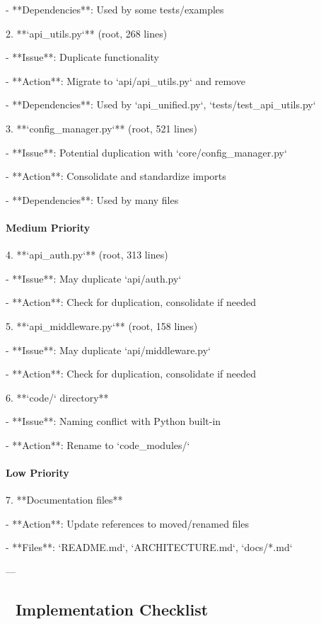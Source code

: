 \documentclass[11pt,a4paper]{article}
\begin{document}
   - **Dependencies**: Used by some tests/examples

2. **`api\_utils.py`** (root, 268 lines)

   - **Issue**: Duplicate functionality

   - **Action**: Migrate to `api/api\_utils.py` and remove

   - **Dependencies**: Used by `api\_unified.py`, `tests/test\_api\_utils.py`

3. **`config\_manager.py`** (root, 521 lines)

   - **Issue**: Potential duplication with `core/config\_manager.py`

   - **Action**: Consolidate and standardize imports

   - **Dependencies**: Used by many files

\paragraph{Medium Priority}

4. **`api\_auth.py`** (root, 313 lines)

   - **Issue**: May duplicate `api/auth.py`

   - **Action**: Check for duplication, consolidate if needed

5. **`api\_middleware.py`** (root, 158 lines)

   - **Issue**: May duplicate `api/middleware.py`

   - **Action**: Check for duplication, consolidate if needed

6. **`code/` directory**

   - **Issue**: Naming conflict with Python built-in

   - **Action**: Rename to `code\_modules/`

\paragraph{Low Priority}

7. **Documentation files**

   - **Action**: Update references to moved/renamed files

   - **Files**: `README.md`, `ARCHITECTURE.md`, `docs/*.md`

---

\subsection{📝 Implementation Checklist}
\end{document}
